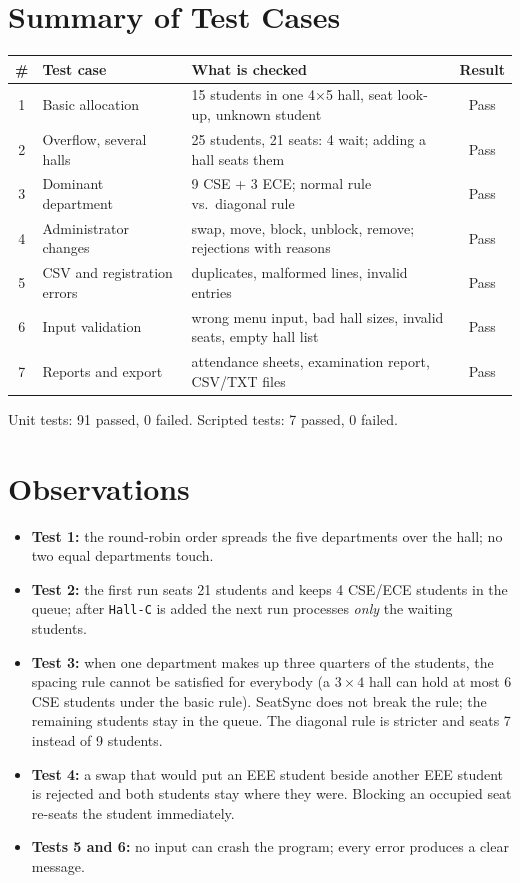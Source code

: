 \documentclass[12pt,a4paper]{report}
\begin{document}
\section{Summary of Test Cases}
\begin{center}
\begin{tabular}{clp{7.6cm}c}
\toprule
\textbf{\#} & \textbf{Test case} & \textbf{What is checked} & \textbf{Result}\\
\midrule
1 & Basic allocation & 15 students in one 4$\times$5 hall, seat look-up, unknown student & Pass\\
2 & Overflow, several halls & 25 students, 21 seats: 4 wait; adding a hall seats them & Pass\\
3 & Dominant department & 9 CSE + 3 ECE; normal rule vs.\ diagonal rule & Pass\\
4 & Administrator changes & swap, move, block, unblock, remove; rejections with reasons & Pass\\
5 & CSV and registration errors & duplicates, malformed lines, invalid entries & Pass\\
6 & Input validation & wrong menu input, bad hall sizes, invalid seats, empty hall list & Pass\\
7 & Reports and export & attendance sheets, examination report, CSV/TXT files & Pass\\
\bottomrule
\end{tabular}
\end{center}
Unit tests: 91 passed, 0 failed. Scripted tests: 7 passed, 0 failed.

\section{Observations}
\begin{itemize}
  \item \textbf{Test 1:} the round-robin order spreads the five departments over the hall; no two equal departments touch.
  \item \textbf{Test 2:} the first run seats 21 students and keeps 4 CSE/ECE students in the queue; after \texttt{Hall-C} is added the next run processes \emph{only} the waiting students.
  \item \textbf{Test 3:} when one department makes up three quarters of the students, the spacing rule cannot be satisfied for everybody (a $3\times4$ hall can hold at most 6 CSE students under the basic rule). SeatSync does not break the rule; the remaining students stay in the queue. The diagonal rule is stricter and seats 7 instead of 9 students.
  \item \textbf{Test 4:} a swap that would put an EEE student beside another EEE student is rejected and both students stay where they were. Blocking an occupied seat re-seats the student immediately.
  \item \textbf{Tests 5 and 6:} no input can crash the program; every error produces a clear message.
\end{itemize}
\end{document}
